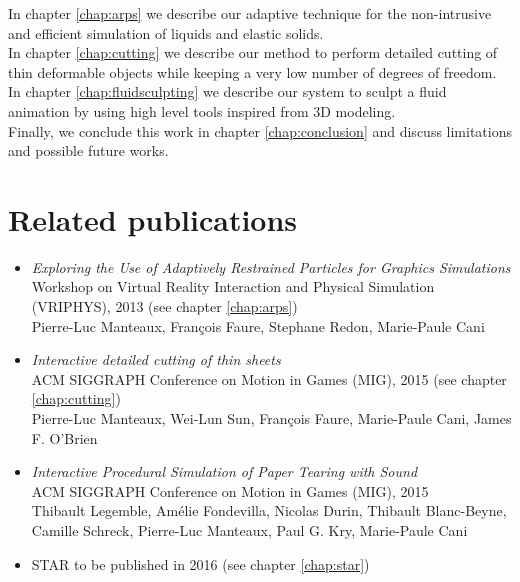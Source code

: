 In chapter \ref{chap:arps} we describe our adaptive technique for the non-intrusive and efficient simulation of liquids and elastic solids. \\

In chapter \ref{chap:cutting} we describe our method to perform detailed cutting of thin deformable objects while keeping a very low number of degrees of freedom.  \\

In chapter \ref{chap:fluidsculpting} we describe our system to sculpt  a fluid animation by using high level tools inspired from 3D modeling. \\

Finally, we conclude this work in chapter \ref{chap:conclusion} and discuss limitations and possible future works.

\section{Related publications}
\begin{itemize}
    \item \cite{Manteaux2013} \emph{Exploring the Use of Adaptively Restrained Particles for Graphics Simulations} \\
    Workshop on Virtual Reality Interaction and Physical Simulation (VRIPHYS), 2013 (see chapter \ref{chap:arps})\\
    Pierre-Luc Manteaux, François Faure, Stephane Redon, Marie-Paule Cani
    \item \cite{Manteaux2015} \emph{Interactive detailed cutting of thin sheets} \\
        ACM SIGGRAPH Conference on Motion in Games (MIG), 2015 (see chapter \ref{chap:cutting})\\
        Pierre-Luc Manteaux, Wei-Lun Sun, François Faure, Marie-Paule Cani, James F. O'Brien
            \item \cite{Lejemble2015} \emph{Interactive Procedural Simulation of Paper Tearing with Sound} \\
    ACM SIGGRAPH Conference on Motion in Games (MIG), 2015 \\
    Thibault Legemble, Amélie Fondevilla, Nicolas Durin, Thibault Blanc-Beyne, Camille Schreck, Pierre-Luc Manteaux, Paul G. Kry, Marie-Paule Cani
	\item STAR to be published in 2016 (see chapter \ref{chap:star})
\end{itemize}
